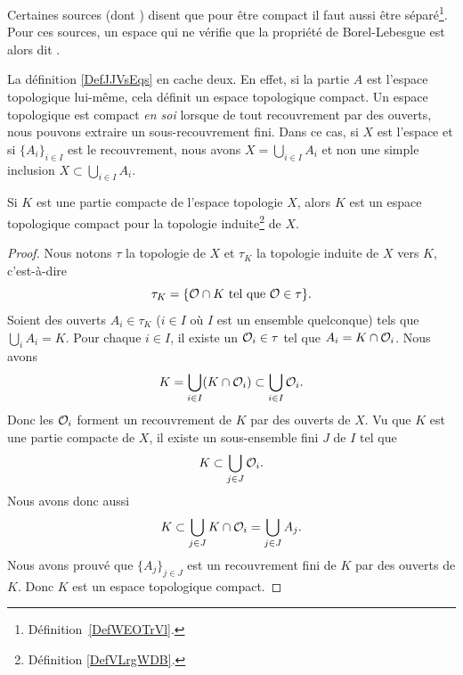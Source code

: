 \begin{remark}
    Certaines sources (dont ) disent que pour être compact il faut aussi être séparé\footnote{Définition~\ref{DefWEOTrVl}.}. Pour ces sources, un espace qui ne vérifie que la propriété de Borel-Lebesgue est alors dit .
\end{remark}

\begin{normaltext}
    La définition \ref{DefJJVsEqs} en cache deux. En effet, si la partie \( A\) est l'espace topologique lui-même, cela définit un espace topologique compact. Un espace topologique est compact \emph{en soi} lorsque de tout recouvrement par des ouverts, nous pouvons extraire un sous-recouvrement fini. Dans ce cas, si \( X\) est l'espace et si \( \{ A_i \}_{i\in I}\) est le recouvrement, nous avons \( X=\bigcup_{i\in I}A_i\) et non une simple inclusion \( X\subset \bigcup_{i\in I}A_i\).
\end{normaltext}

\begin{lemma}       \label{LEMooVYTRooKTIYdn}
    Si \( K\) est une partie compacte de l'espace topologie \( X\), alors \( K\) est un espace topologique compact pour la topologie induite\footnote{Définition \ref{DefVLrgWDB}.} de \( X\).
\end{lemma}

\begin{proof}
    Nous notons \( \tau\) la topologie de \( X\) et \( \tau_K\) la topologie induite de \( X\) vers \( K\), c'est-à-dire
    \begin{equation}
        \tau_K=\{ \mathcal{O}\cap K\text{ tel que } \mathcal{O}\in\tau \}.
    \end{equation}
    Soient des ouverts \( A_i\in \tau_K\) (\( i\in I\) où \( I\) est un ensemble quelconque) tels que \( \bigcup_iA_i=K\). Pour chaque \( i\in I\), il existe un \( \mathcal{O}_i\in \tau\) tel que \( A_i=K\cap\mathcal{O}_i\). Nous avons
    \begin{equation}
        K=\bigcup_{i\in I}(K\cap\mathcal{O}_i)\subset\bigcup_{i\in I}\mathcal{O}_i.
    \end{equation}
    Donc les \( \mathcal{O}_i\) forment un recouvrement de \( K\) par des ouverts de \( X\). Vu que \( K\) est une partie compacte de \( X\), il existe un sous-ensemble fini \( J\) de \( I\) tel que
    \begin{equation}
        K\subset\bigcup_{j\in J}\mathcal{O}_i.
    \end{equation}
    Nous avons donc aussi
    \begin{equation}
        K\subset\bigcup_{j\in J}K\cap\mathcal{O}_i=\bigcup_{j\in J}A_j.
    \end{equation}
    Nous avons prouvé que \( \{ A_j \}_{j\in J}\) est un recouvrement fini de \( K\) par des ouverts de \( K\). Donc \( K\) est un espace topologique compact.
\end{proof}

